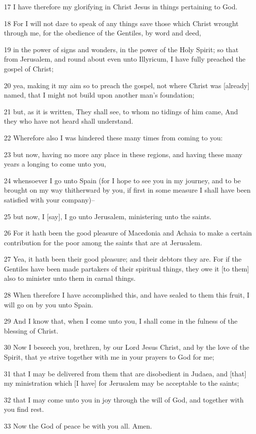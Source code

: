\par 17 I have therefore my glorifying in Christ Jesus in things pertaining to God.
\par 18 For I will not dare to speak of any things save those which Christ wrought through me, for the obedience of the Gentiles, by word and deed,
\par 19 in the power of signs and wonders, in the power of the Holy Spirit; so that from Jerusalem, and round about even unto Illyricum, I have fully preached the gospel of Christ;
\par 20 yea, making it my aim so to preach the gospel, not where Christ was [already] named, that I might not build upon another man's foundation;
\par 21 but, as it is written, They shall see, to whom no tidings of him came, And they who have not heard shall understand.
\par 22 Wherefore also I was hindered these many times from coming to you:
\par 23 but now, having no more any place in these regions, and having these many years a longing to come unto you,
\par 24 whensoever I go unto Spain (for I hope to see you in my journey, and to be brought on my way thitherward by you, if first in some measure I shall have been satisfied with your company)--
\par 25 but now, I [say], I go unto Jerusalem, ministering unto the saints.
\par 26 For it hath been the good pleasure of Macedonia and Achaia to make a certain contribution for the poor among the saints that are at Jerusalem.
\par 27 Yea, it hath been their good pleasure; and their debtors they are. For if the Gentiles have been made partakers of their spiritual things, they owe it [to them] also to minister unto them in carnal things.
\par 28 When therefore I have accomplished this, and have sealed to them this fruit, I will go on by you unto Spain.
\par 29 And I know that, when I come unto you, I shall come in the fulness of the blessing of Christ.
\par 30 Now I beseech you, brethren, by our Lord Jesus Christ, and by the love of the Spirit, that ye strive together with me in your prayers to God for me;
\par 31 that I may be delivered from them that are disobedient in Judaea, and [that] my ministration which [I have] for Jerusalem may be acceptable to the saints;
\par 32 that I may come unto you in joy through the will of God, and together with you find rest.
\par 33 Now the God of peace be with you all. Amen.

